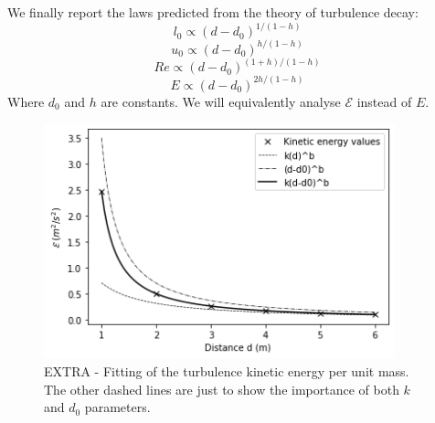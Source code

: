 \documentclass[11pt,titlepage]{article}
\begin{document}
We finally report the laws predicted from the theory of turbulence decay:
\begin{equation} \label{l_0_decay}
	l_0 \propto (d-d_0)^{1/(1-h)}
\end{equation}
\begin{equation}\label{u_0_decay}
	u_0 \propto (d-d_0)^{h/(1-h)}
\end{equation}
\begin{equation}\label{Re_decay}
	Re \propto (d-d_0)^{(1+h)/(1-h)}
\end{equation}
\begin{equation}\label{E_decay}
	E \propto (d-d_0)^{2h/(1-h)}
\end{equation}
Where $d_0$ and $h$ are constants. We will equivalently analyse $\mathcal{E}$ instead of $E$.
	\begin{center} 
	\begin{figure} [h]
		\centering
		\includegraphics[width = 4in]{./figures/ex1_5_1.png}
		\caption{EXTRA - Fitting of the turbulence kinetic energy per unit mass. The other dashed lines are just to show the importance of both $k$ and $d_0$ parameters.}
		\label{fig5}
	\end{figure}
\end{center}
\end{document}

